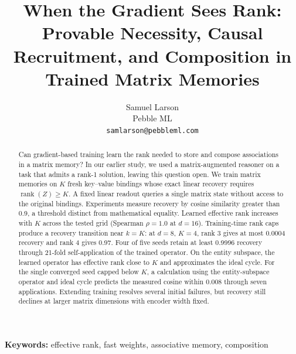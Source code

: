 \documentclass{article}
\title{When the Gradient Sees Rank: Provable
Necessity, Causal Recruitment, and Composition in Trained Matrix
Memories}
\author{%
  Samuel Larson\\
  Pebble ML\\
  \texttt{samlarson@pebbleml.com}%
}
\theoremstyle{plain}
\newcommand{\rank}{\operatorname{rank}}
\begin{document}
\maketitle

\begin{abstract}
Can gradient-based training learn the rank needed to store and compose
associations in a matrix memory? In our earlier study, we used a
matrix-augmented reasoner on a task that admits a rank-1 solution,
leaving this question open. We train matrix memories on $K$ fresh key--value
bindings whose exact linear recovery requires $\rank(Z) \geq K$.
A fixed linear readout queries a single matrix state without access to
the original bindings. Experiments measure recovery by cosine similarity
greater than 0.9, a threshold distinct from mathematical equality.
Learned effective rank increases with $K$ across the tested grid
(Spearman $\rho = 1.0$ at $d = 16$).
Training-time rank caps produce a recovery transition near $k = K$:
at $d = 8$, $K = 4$, rank 3 gives at most 0.0004 recovery and rank 4
gives 0.97.
Four of five seeds retain at least 0.9996 recovery through 21-fold
self-application of the trained operator.
On the entity subspace, the learned operator has effective rank close
to $K$ and approximates the ideal cycle.
For the single converged seed capped below $K$, a calculation using
the entity-subspace operator and ideal cycle predicts the measured
cosine within 0.008 through seven applications.
Extending training resolves several initial failures, but recovery still
declines at larger matrix dimensions with encoder width fixed.
\end{abstract}

\noindent\textbf{Keywords:} effective rank, fast weights, associative
memory, composition












\end{document}
